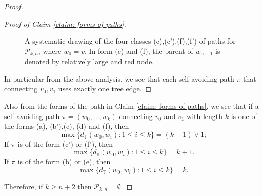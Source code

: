 \documentclass[12pt]{article}
\numberwithin{equation}{section}
\newcommand{\1}{\mathbf{1}}
\begin{document}
\begin{proof}
\begin{proof}[Proof of Claim \ref{claim: forms of paths}]
\begin{figure}[h!]
 		\caption{A systematic drawing of the four classes (c),(c'),(f),(f') of paths for $\mathscr{P}_{k,n}$, where $w_0=v$. In form (c) and (f), the parent of $w_{\alpha-1}$ is denoted by relatively large and  red node.}
 		\label{fig: four classes of paths cc'ff'}
 		
 	\end{figure}
 	
 	In particular from the above analysis, we see that each self-avoiding path $\pi$ that connecting $v_0,v_1$ uses exactly one tree edge. 
 \end{proof}
 	
 
 	
 	
 	Also from the forms of the path in Claim \ref{claim: forms of paths}, we see that if a self-avoiding path $\pi=(w_0,\ldots,w_k)$ connecting $v_0$ and $v_1$ with length $k$ is one of the forms (a), (b'),(c), (d) and (f), then 
 	\[
 	\max\{d_{\mathbb{T}}(w_0,w_i):1\leq i\leq k \}=(k-1)\vee 1;
 	\] 
 	If $\pi$ is of the form (c') or (f'), then 
 	\[
 	\max\{d_{\mathbb{T}}(w_0,w_i):1\leq i\leq k \}=k+1.
 	\] 
 	If $\pi$ is of the form (b) or (e), then 
 	\[
 	\max\{d_{\mathbb{T}}(w_0,w_i):1\leq i\leq k \}=k.
 	\] 
 	
 	Therefore, if $k\geq n+2$ then $\mathscr{P}_{k,n}=\emptyset$.
 	

\end{proof}
\end{document}

